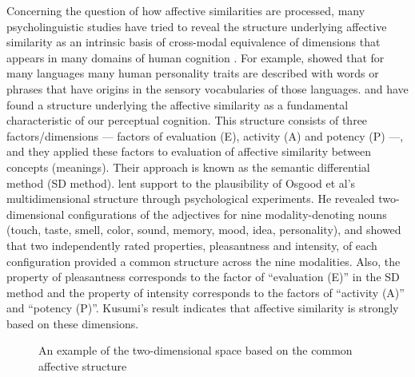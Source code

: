 Concerning the question of how affective similarities are processed,
many psycholinguistic studies have tried to reveal the structure 
underlying affective similarity 
as an intrinsic basis of cross-modal equivalence of dimensions 
that appears in many domains of human cognition
\cite{Asch55,Osgood57,Osgood80,Kusumi88}.
For example,  showed that for many languages
many human personality traits are described with words or phrases that 
have origins in the sensory vocabularies of those languages.
 and  have found a structure underlying the affective 
similarity as a fundamental characteristic of our perceptual cognition.
This structure consists of three factors/dimensions 
--- factors of evaluation (E), activity (A) and potency (P) ---, 
and they applied these factors to evaluation of 
affective similarity between concepts (meanings). 
Their approach is known as the semantic differential method (SD method).
 lent support to the plausibility of Osgood et al's 
multidimensional structure through psychological experiments. 
He revealed two-dimensional configurations of the adjectives for 
nine modality-denoting nouns (touch, taste, smell, color, 
sound, memory, mood, idea, personality), and showed that 
two independently rated properties, pleasantness and intensity, of each
configuration provided a common structure across the nine modalities.
Also, the property of pleasantness corresponds to the factor of ``evaluation (E)'' 
in the SD method and the property of intensity corresponds 
to the factors of ``activity (A)'' and ``potency (P)''.
Kusumi's result indicates that affective similarity is strongly based on these dimensions. 

\begin{figure}[t]
\begin{center}
  \makeatletter\ifDS@epsbox
  \else
  \mbox{}
  \fi\makeatother
\end{center}
\caption{An example of the two-dimensional space based on the common affective structure}
\label{fig:space}
\end{figure}

